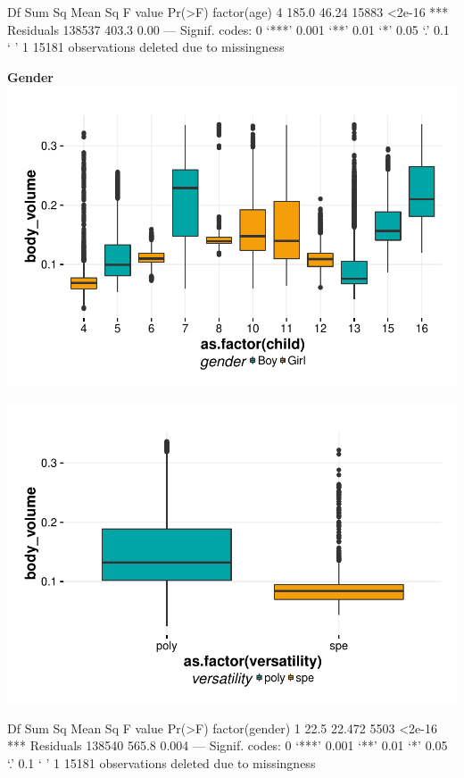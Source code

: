\documentclass{article}
\begin{document}
\begin{Schunk}
\begin{Soutput}
                Df Sum Sq Mean Sq F value Pr(>F)    
factor(age)      4  185.0   46.24   15883 <2e-16 ***
Residuals   138537  403.3    0.00                   
---
Signif. codes:  0 ‘***’ 0.001 ‘**’ 0.01 ‘*’ 0.05 ‘.’ 0.1 ‘ ’ 1
15181 observations deleted due to missingness
\end{Soutput}
\end{Schunk}

\textbf{Gender}
\includegraphics{features-plot_body_volume_child_gender_quiz}

\includegraphics{features-plot_body_volume_gender_quiz}

\begin{Schunk}
\begin{Soutput}
                   Df Sum Sq Mean Sq F value Pr(>F)    
factor(gender)      1   22.5  22.472    5503 <2e-16 ***
Residuals      138540  565.8   0.004                   
---
Signif. codes:  0 ‘***’ 0.001 ‘**’ 0.01 ‘*’ 0.05 ‘.’ 0.1 ‘ ’ 1
15181 observations deleted due to missingness
\end{Soutput}
\end{Schunk}
\end{document}
